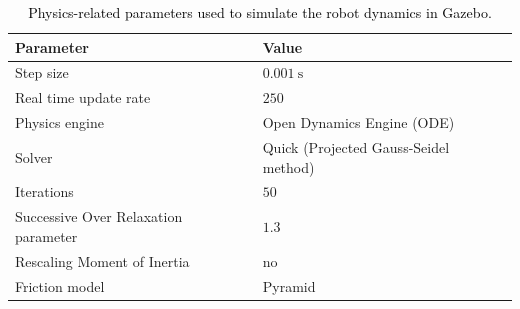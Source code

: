 \documentclass[sensors,article,accept,pdftex,moreauthors]{Definitions/mdpi}
\newcommand{\MF}[1]{\textcolor{black}{#1}}
\begin{document}
\begin{table}[H]%
	\caption{\MF{Physics-related parameters used to simulate the robot dynamics in Gazebo.}}
	\label{tab:pys_param}
	\begin{tabularx}{\textwidth}{CC}
		\toprule
		\textbf{Parameter} & \textbf{Value} \\
		\midrule
		Step size & $0.001 \ \mathrm{s}$\\
		Real time update rate & $250$ \\
		Physics engine & Open Dynamics Engine (ODE) \\
		Solver & Quick (Projected Gauss-Seidel method)\\
		Iterations & $50$\\
		Successive Over Relaxation parameter & $1.3$\\
		Rescaling Moment of Inertia  & no \\
		Friction model & Pyramid \\		
		\bottomrule	\end{tabularx}
\end{table}
\end{document}
